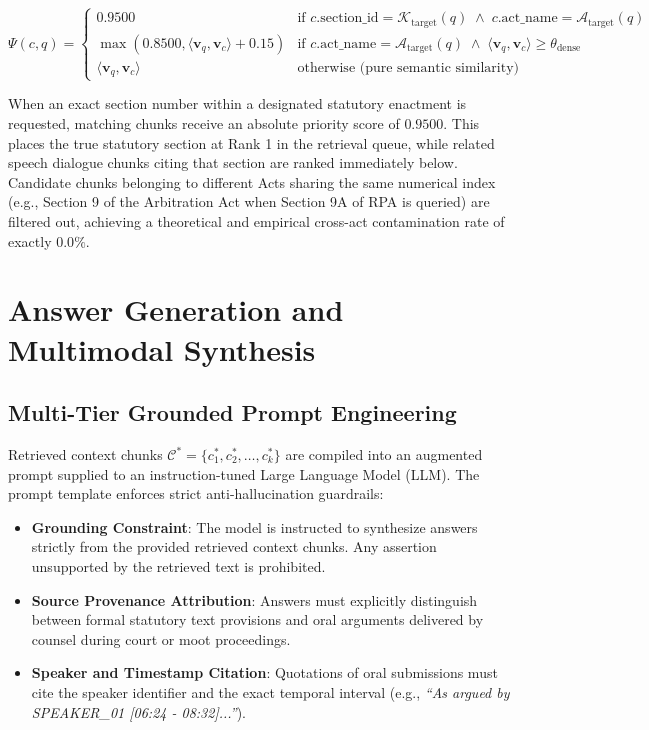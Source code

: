 \documentclass{llncs}
\begin{document}
\begin{equation}
\label{eq:metadata_boost}
\Psi(c, q) = 
\begin{cases}
0.9500 & \text{if } c.\text{section\_id} = \mathcal{K}_{\text{target}}(q) \;\land\; c.\text{act\_name} = \mathcal{A}_{\text{target}}(q) \\
\max\left(0.8500, \langle \mathbf{v}_q, \mathbf{v}_c \rangle + 0.15\right) & \text{if } c.\text{act\_name} = \mathcal{A}_{\text{target}}(q) \;\land\; \langle \mathbf{v}_q, \mathbf{v}_c \rangle \ge \theta_{\text{dense}} \\
\langle \mathbf{v}_q, \mathbf{v}_c \rangle & \text{otherwise (pure semantic similarity)}
\end{cases}
\end{equation}

When an exact section number within a designated statutory enactment is requested, matching chunks receive an absolute priority score of $0.9500$. This places the true statutory section at Rank 1 in the retrieval queue, while related speech dialogue chunks citing that section are ranked immediately below. Candidate chunks belonging to different Acts sharing the same numerical index (e.g., Section 9 of the Arbitration Act when Section 9A of RPA is queried) are filtered out, achieving a theoretical and empirical cross-act contamination rate of exactly $0.0\%$.


\section{Answer Generation and Multimodal Synthesis}
\label{sec:synthesis}

\subsection{Multi-Tier Grounded Prompt Engineering}
Retrieved context chunks $\mathcal{C}^* = \{c_1^*, c_2^*, \dots, c_k^*\}$ are compiled into an augmented prompt supplied to an instruction-tuned Large Language Model (LLM). The prompt template enforces strict anti-hallucination guardrails:
\begin{itemize}
    \item \textbf{Grounding Constraint}: The model is instructed to synthesize answers strictly from the provided retrieved context chunks. Any assertion unsupported by the retrieved text is prohibited.
    \item \textbf{Source Provenance Attribution}: Answers must explicitly distinguish between formal statutory text provisions and oral arguments delivered by counsel during court or moot proceedings.
    \item \textbf{Speaker and Timestamp Citation}: Quotations of oral submissions must cite the speaker identifier and the exact temporal interval (e.g., \textit{``As argued by SPEAKER\_01 [06:24 - 08:32]...''}).
\end{itemize}
\end{document}

